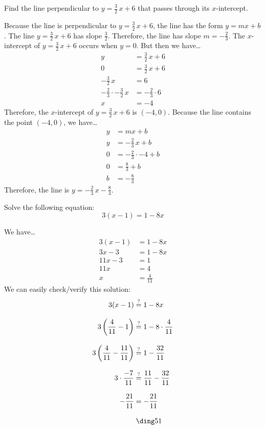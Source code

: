 \documentclass[11pt,letterpaper]{article}
\begin{document}

 Find the line perpendicular to $y= \frac{3}{2}\, x + 6$ that passes through its $x$-intercept. \pspace

\sol Because the line is perpendicular to $y= \frac{3}{2}\, x + 6$, the line has the form $y= mx + b$. The line $y= \frac{3}{2}\,x + 6$ has slope $\frac{3}{2}$. Therefore, the line has slope $m= -\frac{2}{3}$. The $x$-intercept of $y= \frac{3}{2}\,x + 6$ occurs when $y= 0$. But then we have\dots
	\[
	\begin{aligned}
	y&= \frac{3}{2}\,x + 6 \\[0.3cm]
	0&= \frac{3}{2}\,x + 6 \\[0.3cm]
	-\frac{3}{2}\,x&= 6 \\[0.3cm]
	-\frac{2}{3} \cdot -\frac{3}{2}\,x&= -\frac{2}{3} \cdot 6 \\[0.3cm]
	x&= -4 
	\end{aligned}
	\]
Therefore, the $x$-intercept of $y= \frac{3}{2}\,x + 6$ is $(-4, 0)$. Because the line contains the point $(-4, 0)$, we have\dots
	\[
	\begin{aligned}
	y&= mx + b \\[0.3cm]
	y&= -\frac{2}{3}\,x + b \\[0.3cm]
	0&= -\frac{2}{3} \cdot -4 + b \\[0.3cm]
	0&= \frac{8}{3} + b \\[0.3cm]
	b&= -\frac{8}{3}
	\end{aligned}
	\]
Therefore, the line is $y= -\frac{2}{3}\,x - \frac{8}{3}$. 



\newpage



 Solve the following equation:
	\[
	3(x - 1)= 1 - 8x
	\] \pspace

\sol We have\dots
	\[
	\begin{aligned}
	3(x - 1)&= 1 - 8x \\[0.3cm]
	3x - 3&= 1 - 8x \\[0.3cm]
	11x - 3&= 1 \\[0.3cm]
	11x&= 4 \\[0.3cm]
	x&= \frac{4}{11}
	\end{aligned}
	\]
We can easily check/verify this solution:
	\[
	\begin{aligned}
	3(x - 1)&\stackrel{?}{=} 1 - 8x \\[0.3cm]
	3 \left( \frac{4}{11} - 1 \right)&\stackrel{?}{=} 1 - 8 \cdot \frac{4}{11} \\[0.3cm]
	3 \left( \dfrac{4}{11} - \dfrac{11}{11} \right)&\stackrel{?}{=} 1 - \dfrac{32}{11} \\[0.3cm]
	3 \cdot \dfrac{-7}{11}&\stackrel{?}{=} \dfrac{11}{11} - \dfrac{32}{11} \\[0.3cm]
	-\dfrac{21}{11}&= -\dfrac{21}{11} \\[0.3cm]
	&\;\text{\cmark}
	\end{aligned}
	\]
\end{document}
